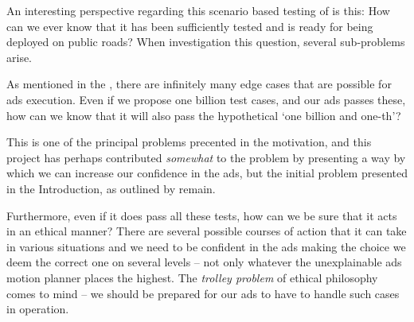 An interesting perspective regarding this scenario based testing of
 is this: How can we ever know that it has been sufficiently
tested and is ready for being deployed on public roads? When investigation this
question, several sub-problems arise.

As mentioned in the , there are infinitely many
edge cases that are possible for \acrshort{ads} execution. Even if we propose
one billion test cases, and our \acrshort{ads} passes these, how can we know
that it will also pass the hypothetical `one billion and one-th'?

This is one of the principal problems precented in the motivation, and this project has perhaps
contributed \emph{somewhat} to the problem by presenting a way by which we can increase our
confidence in the \acrshort{ads}, but the initial problem presented in the Introduction, as outlined
by \citeauthor{leahy2024grandchallenge} remain.

Furthermore, even if it does pass all these tests, how can we be sure that it
acts in an ethical manner? There are several possible courses of action that it
can take in various situations and we need to be confident in the \acrshort{ads} making the choice
we deem the correct one on several levels -- not only whatever the unexplainable \acrshort{ads}
motion planner places the highest. The \emph{trolley problem} of ethical
philosophy~\cite{JJThomson1985TrolleyProblem} comes to mind -- we should be prepared for our
\acrshort{ads} to have to handle such cases in operation.
